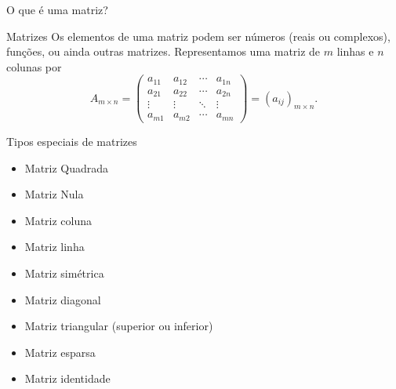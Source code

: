 \documentclass{beamer}
\begin{document}
\begin{darkframes}
\begin{frame}{O que é uma matriz?}
         
         
\end{frame}

\begin{frame}{Matrizes}
Os elementos de uma matriz podem ser números (reais ou complexos), funções, ou ainda outras matrizes. Representamos uma matriz de $m$ linhas e $n$ colunas por
\begin{equation*}
 A_{m\times n} = \begin{pmatrix}
             a_{11} & a_{12} & \cdots & a_{1n}\\
             a_{21} & a_{22} & \cdots & a_{2n}\\
             \vdots & \vdots & \ddots & \vdots\\
             a_{m1} & a_{m2} & \cdots & a_{mn}
         \end{pmatrix} = (a_{ij})_{m\times n}.
 \end{equation*}
\end{frame}

\begin{frame}{Tipos especiais de matrizes}

\begin{itemize}
    \item<2-> Matriz Quadrada
    \item<3-> Matriz Nula
    \item<4-> Matriz coluna
    \item<5-> Matriz linha
    \item<6-> Matriz simétrica
    \item<7-> Matriz diagonal
    \item<8-> Matriz triangular (superior ou inferior)
    \item<9-> Matriz esparsa
    \item<10-> Matriz identidade
\end{itemize}
\end{frame}


\end{darkframes}
\end{document}
